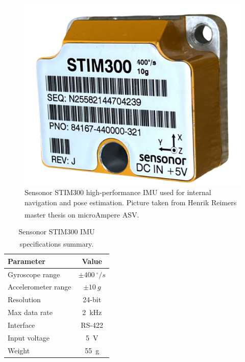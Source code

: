 \begin{figure}[H]
    \centering
    \includegraphics[width=0.5\linewidth]{Pictures/Hardware/Sensors/IMU.png}
    \caption{Sensonor STIM300 high-performance IMU used for internal navigation and pose estimation. Picture taken from Henrik Reimers master thesis on microAmpere ASV.\textsuperscript{\cite{microAmpere_hardware_master_thesis1}}}
    \label{fig:microAmpere-imu}
\end{figure}

\begin{table}[H]
    \centering
    \caption{Sensonor STIM300 IMU specifications summary.\textsuperscript{\cite{imu_data_sheet}}}
    \label{tab:IMU-specs}
    \begin{tabular}{lc}
        \hline
        \textbf{Parameter} & \textbf{Value} \\
        \hline
        Gyroscope range & $\pm400~^{\circ}/s$ \\
        Accelerometer range & $\pm10~g$ \\
        Resolution & 24-bit \\
        Max data rate & 2~kHz \\
        Interface & RS-422 \\
        Input voltage & 5~V \\
        Weight & 55~g \\
        \hline
    \end{tabular}
\end{table}



\newpage



